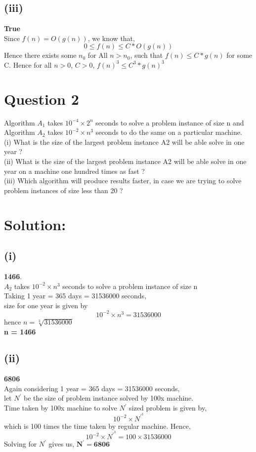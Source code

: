 \documentclass[12pt, a4paper]{article}
\begin{document}
\subsection*{(iii)} \textbf{True}
\\Since $f(n) = O(g(n))$, we know that, $$ 0 \leq  f(n) \leq C * O(g(n)) $$
Hence there exists some $n_0$ for All $n>n_0$, such that $f(n) \leq C * g(n)$ for some C. Hence for all $n>0$, $C>0$, $f(n)^{3} \leq C^{3} * g(n)^{3}$
\section*{Question 2}
Algorithm $A_1$ takes $10^{-4} \times 2^{n}$ seconds to solve a problem instance of size n and Algorithm $A_2$ takes $10^{-2} \times n^{3}$ seconds to do the same on a particular machine.\\(i) What is the size of the largest problem instance A2 will be able solve in one year ?\\(ii) What is the size of the largest problem instance A2 will be able solve in one year on a machine one hundred times as fast ?\\(iii) Which algorithm will produce results faster, in case we are trying to solve problem instances of size less than 20 ?
\section*{Solution:}
\subsection*{(i)} \textbf{1466}. \\$A_2$ takes $10^{-2} \times n^{3}$ seconds to solve a problem instance of size n
\\Taking 1 year = 365 days = 31536000 seconds,  \\size for one year is given by $$ 10^{-2} \times n^{3} = 31536000$$ hence $n = \sqrt[3]{31536000}$\\ \textbf{n = 1466}
\subsection*{(ii)} \textbf{6806} \\Again considering 1 year = 365 days = 31536000 seconds, \\let $N^{'}$ be the size of problem instance solved by 100x machine. \\Time taken by 100x machine to solve $N^{'}$ sized problem is given by, $$ 10^{-2} \times N^{'^{3}}$$ which is 100 times the time taken by regular machine. Hence, $$ 10^{-2} \times N^{'^{3}} = 100 \times 31536000$$ Solving for $N^{'}$ gives us, $\bm{ N^{'} = 6806}$
\end{document}

